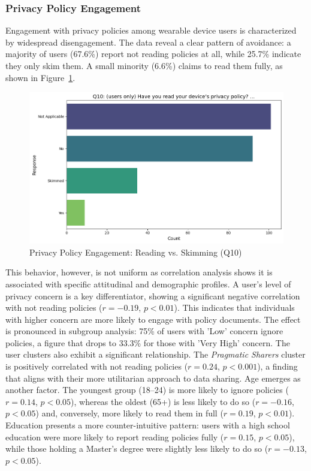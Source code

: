 	\subsubsection{Privacy Policy Engagement}
	Engagement with privacy policies among wearable device users is characterized by widespread disengagement. The data reveal a clear pattern of avoidance: a majority of users (67.6\%) report not reading policies at all, while 25.7\% indicate they only skim them. A small minority (6.6\%) claims to read them fully, as shown in Figure~\ref{fig:Q10_policy_engagement}.
	\begin{figure}[ht]\centering
		\includegraphics[width=1\linewidth]{figures/questions/Q10_single_choice.png}
		\caption{Privacy Policy Engagement: Reading vs. Skimming (Q10)}
		\label{fig:Q10_policy_engagement}
	\end{figure}
	This behavior, however, is not uniform as correlation analysis shows it is associated with specific attitudinal and demographic profiles. A user's level of privacy concern is a key differentiator, showing a significant negative correlation with not reading policies ($r = -0.19$, $p < 0.01$). This indicates that individuals with higher concern are more likely to engage with policy documents. The effect is pronounced in subgroup analysis: 75\% of users with 'Low' concern ignore policies, a figure that drops to 33.3\% for those with 'Very High' concern.
	The user clusters also exhibit a significant relationship. The \textit{Pragmatic Sharers} cluster is positively correlated with not reading policies ($r = 0.24$, $p < 0.001$), a finding that aligns with their more utilitarian approach to data sharing.
	Age emerges as another factor. The youngest group (18--24) is more likely to ignore policies ($r = 0.14$, $p < 0.05$), whereas the oldest (65+) is less likely to do so ($r = -0.16$, $p < 0.05$) and, conversely, more likely to read them in full ($r = 0.19$, $p < 0.01$). Education presents a more counter-intuitive pattern: users with a high school education were more likely to report reading policies fully ($r = 0.15$, $p < 0.05$), while those holding a Master's degree were slightly less likely to do so ($r = -0.13$, $p < 0.05$).	

